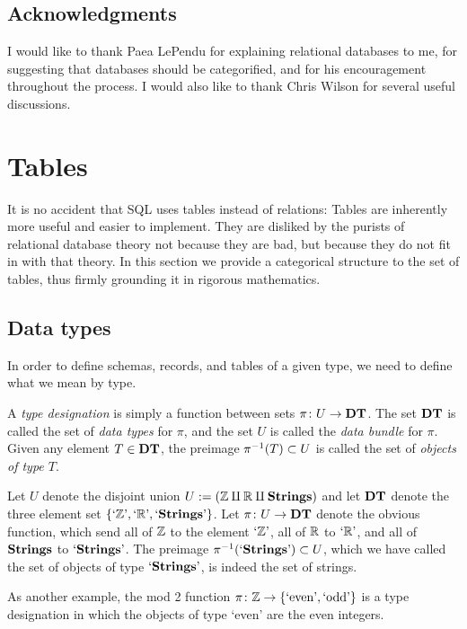 \documentclass{amsart}
\def\DT{{\bf DT}}
\def\Strings{{\bf Strings}}
\def\'{\tn{'}}
\begin{document}
\subsection{Acknowledgments}

I would like to thank Paea LePendu for explaining relational databases to me, for suggesting that databases should be categorified, and for his encouragement throughout the process.  I would also like to thank Chris Wilson for several useful discussions.

\section{Tables}\label{sec:tables}

It is no accident that SQL uses tables instead of relations: Tables are inherently more useful and easier to implement.  They are disliked by the purists of relational database theory not because they are bad, but because they do not fit in with that theory.  In this section we provide a categorical structure to the set of tables, thus firmly grounding it in rigorous mathematics.

\subsection{Data types}

In order to define schemas, records, and tables of a given type, we need to define what we mean by type. 

\begin{definition}

A {\em type designation} is simply a function between sets $\pi\taking U\to \DT$.  The set $\DT$ is called the set of {\em data types} for $\pi$, and the set $U$ is called the {\em data bundle} for $\pi$.  Given any element $T\in\DT$, the preimage $\pi^\m1(T)\ss U$ is called the set of {\em objects of type $T$}.

\end{definition}

\begin{example}\label{ex:type designation}

Let $U$ denote the disjoint union $U:=(\ZZ\amalg\RR\amalg\Strings)$ and let $\DT$ denote the three element set $\{`\ZZ\', `\RR\', `\Strings\'\}$.  Let $\pi\taking U\to\DT$ denote the obvious function, which send all of ${\mathbb Z}$ to the element $`\ZZ\'$, all of ${\mathbb R}$ to $`\RR\'$, and all of $\Strings$ to $`\Strings\'$. 
The preimage $\pi^\m1(`\Strings\')\ss U$, which we have called the set of objects of type $`\Strings\'$, is indeed the set of strings.

As another example, the mod 2 function $\pi\colon{\mathbb Z}\rightarrow\{\textnormal{`even'},\textnormal{`odd'}\}$ is a type designation in which the objects of type `even' are the even integers.

\end{example}
\end{document}
